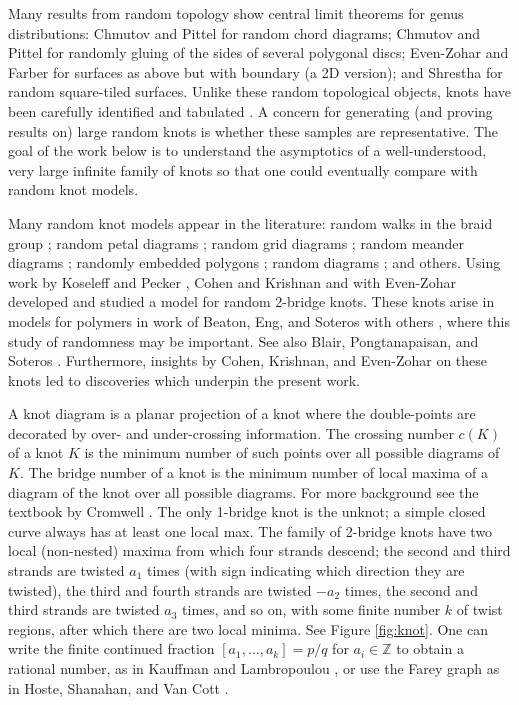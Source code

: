 \documentclass[11pt]{amsart}
\theoremstyle{definition}
\theoremstyle{remark}
\numberwithin{equation}{section}
\begin{document}
Many results from random topology show central limit theorems for genus distributions:  Chmutov and Pittel \cite{ChmPit:genus} for random chord diagrams; Chmutov and Pittel \cite{ChmPit:poly} for randomly gluing of the sides of several polygonal discs;  Even-Zohar and Farber \cite{EZFar} for surfaces as above but with boundary (a 2D version); and Shrestha  \cite{Shr:genus} for random square-tiled surfaces.   Unlike these random topological objects, knots have been carefully identified and tabulated \cite{knotinfo}.  A concern for generating (and proving results on) large random knots is whether these samples are representative.  The goal of the work below is to understand the asymptotics of a well-understood, very large infinite family of knots so that one could eventually compare with random knot models.

Many random knot models appear in the literature:  random walks in the braid group \cite{SorVil, DunTio}; random petal diagrams \cite{EZHLN, EZHLN:distpetal}; random grid diagrams \cite{Doig}; random meander diagrams \cite{OwaTsv}; randomly embedded polygons \cite{CanSho, CCRS, TriCNSS, CanSchSho}; random diagrams \cite{CanChaMas}; and others.  Using work by Koseleff and Pecker \cite{KosPecRou:10crossings, KosPec4, KosPec3, KosPec:Alex}, Cohen and Krishnan \cite{CoKr} and with Even-Zohar \cite{CoEZKr} developed and studied a model for random 2-bridge knots.  These knots arise in models for polymers in work of Beaton, Eng, and Soteros with others \cite{BES, BES:stats, BES+:nano, BES+:4}, where this study of randomness may be important.  See also Blair, Pongtanapaisan, and Soteros \cite{BPS}. Furthermore, insights by Cohen, Krishnan, and Even-Zohar on these knots led to discoveries which underpin the present work.



A knot diagram is a planar projection of a knot where the double-points are decorated by over- and under-crossing information. The crossing number $c(K)$ of a knot $K$ is the minimum number of such points over all possible diagrams of $K$.  The bridge number of a knot is the minimum number of local maxima  of a diagram of the knot over all possible diagrams.  For more background see the textbook by Cromwell \cite{Crom}.  The only 1-bridge knot is the unknot; a simple closed curve always has at least one local max.  The family of 2-bridge knots have two local (non-nested) maxima from which four strands descend; the second and third strands are twisted $a_1$ times (with sign indicating which direction they are twisted), the third and fourth strands are twisted $-a_2$ times, the second and third strands are twisted $a_3$ times, and so on, with some finite number $k$ of twist regions, after which there are two local minima.  See Figure \ref{fig:knot}.  One can write the finite continued fraction $[a_1,\ldots,a_k]=p/q$ for $a_i\in\mathbb{Z}$ to obtain a rational number, as in Kauffman and Lambropoulou \cite{KauffLamb:tangles, KauffLamb:class}, or use the Farey graph as in Hoste, Shanahan, and Van Cott \cite{HSVC}.
\end{document}
